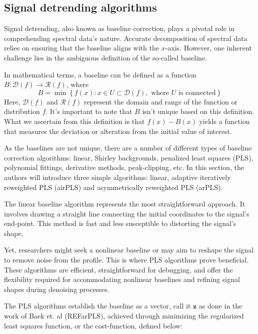 \documentclass{article}
\begin{document}
%
%
\subsection{Signal detrending algorithms}
Signal detrending, also known as baseline correction, plays a pivotal role in comprehending spectral data's nature.
Accurate decomposition of spectral data relies on ensuring that the baseline aligns with the $x$-axis. 
However, one inherent challenge lies in the ambiguous definition of the so-called baseline.

In mathematical terms, a baseline can be defined as a function $B:\mathcal{D}(f) \rightarrow \mathcal{R}(f)$, where
\begin{equation*}
B = \min\left\{ f(x) : x \in U \subset \mathcal{D}(f), \text{ where $U$ is connected}\right\}
\end{equation*}
Here, $\mathcal{D}(f)$ and $\mathcal{R}(f)$ represent the domain and range of the function or distribution $f$.
It's important to note that $B$ isn't unique based on this definition.
What we ascertain from this definition is that $f(x) - B(x)$ yields a function that measures the deviation or alteration from the initial value of interest.

As the baselines are not unique, there are a number of different types of baseline correction algorithms: linear, Shirley backgrounds, penalized least squares (PLS), polynomial fittings, derivative methods, peak-clipping, etc.
In this section, the authors will introduce three simple algorithms: linear, adaptive iteratively reweighted PLS (airPLS) and asymmetrically reweighted PLS (arPLS).

The linear baseline algorithm represents the most straightforward approach.
It involves drawing a straight line connecting the initial coordinates to the signal's end-point.
This method is fast and less susceptible to distorting the signal's shape.

Yet, researchers might seek a nonlinear baseline or may aim to reshape the signal to remove noise from the profile. 
This is where PLS algorithms prove beneficial.
These algorithms are efficient, straightforward for debugging, and offer the flexibility required for accommodating nonlinear baselines and refining signal shapes during denoising processes.

The PLS algorithms establish the baseline as a vector, call it $\mathbf{z}$ as done in the work of Baek et. al (REFarPLS), achieved through minimizing the regularized least squares function, or the cost-function, defined below:
\end{document}
